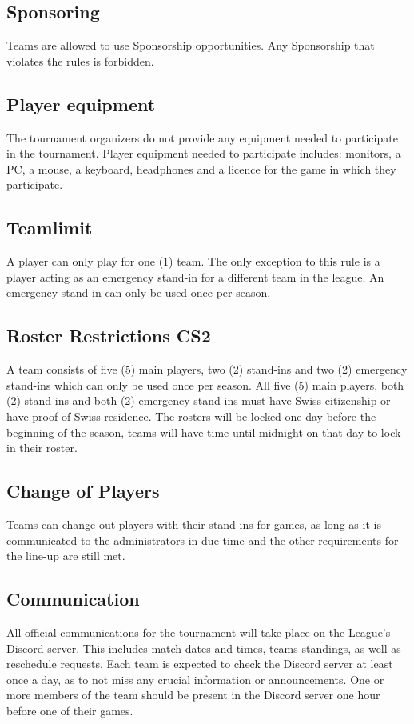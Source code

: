 \documentclass{article}
\begin{document}
\subsection{Sponsoring}
Teams are allowed to use Sponsorship opportunities. Any Sponsorship that violates the rules is forbidden.


\subsection{Player equipment}
The tournament organizers do not provide any equipment needed to participate in the tournament. Player equipment needed to participate 
includes: monitors, a PC, a mouse, a keyboard, headphones and a licence for the game in which they participate. 

\subsection{Teamlimit}
A player can only play for one (1) team. The only exception to this rule is a player acting as an emergency stand-in for a different
team in the league. An emergency stand-in can only be used once per season. 

\subsection{Roster Restrictions CS2}
A team consists of five (5) main players, two (2) stand-ins and two (2) emergency stand-ins which can only be used once per season. 
All five (5) main players, both (2) stand-ins and both (2) emergency stand-ins must have Swiss citizenship or have proof of Swiss 
residence. 
The rosters will be locked one day before the beginning of the season, teams will have time until midnight on that day to lock in their
roster. 


\label{playerrules}\subsection{Change of Players}
Teams can change out players with their stand-ins for games, as long as it is communicated to the administrators in due time and 
the other requirements for the line-up are still met. 

\subsection{Communication}
All official communications for the tournament will take place on the League's Discord server. This includes match dates and times, 
teams standings, as well as reschedule requests. Each team is expected to check the Discord server at least once a day, as to not miss
any crucial information or announcements. One or more members of the team should be present in the Discord server one hour before one 
of their games. 
\end{document}
